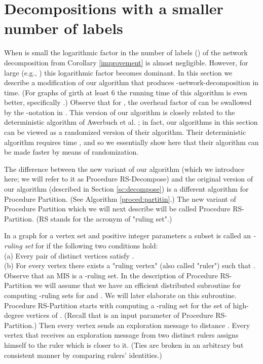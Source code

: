 \documentclass[11pt]{article}
\begin{document}
\section{Decompositions with a smaller number of labels} \label{sc:betterlabels}
When  is small the logarithmic factor in the number of labels () of the network decomposition  from Corollary \ref{improvement} is almost negligible. However, for large  (e.g., ) this logarithmic factor becomes dominant. In this section we describe a modification of our algorithm that produces -network-decomposition in  time. (For graphs of girth at least 6 the running time of this algorithm is even better, specifically .)
Observe that for , the overhead factor of  can be swallowed by the -notation in . This version of our algorithm is closely related to the deterministic algorithm of Awerbuch et al. \cite{AGLP89}; in fact, our algorithms in this section can be viewed as a randomized version of their algorithm. Their deterministic algorithm requires time , and so we essentially show here that their algorithm can be made faster by means of randomization.

The difference between the new variant of our algorithm (which we introduce here; we will refer to it as Procedure RS-Decompose) and the original version of our algorithm (described in Section \ref{sc:decompose}) is a different algorithm for Procedure Partition. (See Algorithm \ref{proced:partitin}.) The new variant of Procedure Partition which we will next describe will be called Procedure RS-Partition. (RS stands for the acronym of "ruling set".) 

In a graph  for a vertex set  and positive integer parameters  a subset  is called an {\em -ruling set} for  if the following two conditions hold: \\
(a) Every pair of distinct vertices  satisfy .\\
(b) For every vertex  there exists a "ruling vertex" (also called "ruler")  such that .\\

Observe that an MIS is a -ruling set. In the description of Procedure RS-Partition we will assume that we have an efficient distributed subroutine for computing -ruling sets for  and . We will later elaborate on this subroutine.
Procedure RS-Partition starts with computing a -ruling set  for the set  of high-degree vertices of . (Recall that  is an input parameter of Procedure RS-Partition.) Then every vertex  sends an exploration message to distance . Every vertex  that receives an exploration message from two distinct rulers  assigns himself to the ruler  which is closer to it. (Ties are broken in an arbitrary but consistent manner by comparing rulers' identities.)
\end{document}
